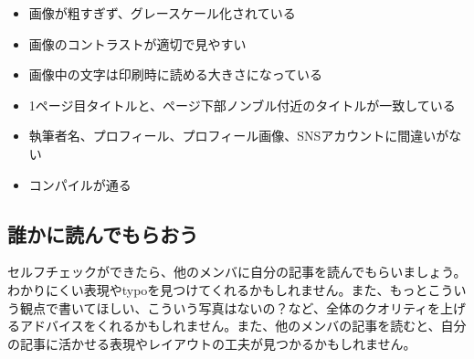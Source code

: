 \begin{itemize}
\item 画像が粗すぎず、グレースケール化されている
\item 画像のコントラストが適切で見やすい
\item 画像中の文字は印刷時に読める大きさになっている
\item 1ページ目タイトルと、ページ下部ノンブル付近のタイトルが一致している
\item 執筆者名、プロフィール、プロフィール画像、SNSアカウントに間違いがない
\item コンパイルが通る
\end{itemize}

\subsection{誰かに読んでもらおう}
セルフチェックができたら、他のメンバに自分の記事を読んでもらいましょう。わかりにくい表現やtypoを見つけてくれるかもしれません。また、もっとこういう観点で書いてほしい、こういう写真はないの？など、全体のクオリティを上げるアドバイスをくれるかもしれません。また、他のメンバの記事を読むと、自分の記事に活かせる表現やレイアウトの工夫が見つかるかもしれません。

\renewcommand{\bibfont}{\footnotesize}


\vspace{-1mm}

